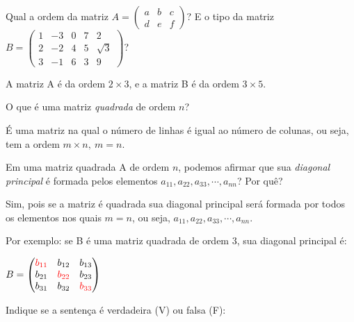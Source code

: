 \documentclass[pdftex, brazil, 12pt, oneside, addpoints, answers]{exam}
\newcommand{\vf}[1][{}]{%
  \fillin[#1][0.25in]%
}
\begin{document}
\begin{questions}
\question
Qual a ordem da matriz
$A = \begin{pmatrix}
a & b & c\\
d & e & f\end{pmatrix}$? E o tipo da matriz
$B = \begin{pmatrix}
  1 & -3 & 0 & 7 & 2\\
  2 & -2 & 4 & 5 & \sqrt{3}\\
  3 & -1 & 6 & 3 & 9
\end{pmatrix}$?
\begin{solutionorlines}[0.50in]
  A matriz A é da ordem $2 \times 3$, e a matriz B é da ordem $3 \times 5$.
\end{solutionorlines}

\question
O que é uma matriz \emph{quadrada} de ordem $n$?
\begin{solutionorlines}[0.50in]
  É uma matriz na qual o número de linhas é igual ao número de colunas, ou seja,
  tem a ordem $m \times n,\ m = n$.
\end{solutionorlines}

\question
Em uma matriz quadrada A de ordem $n$, podemos afirmar que sua \emph{diagonal
  principal} é formada pelos elementos $a_{11}, a_{22}, a_{33}, \cdots, a_{nn}$? Por quê?
\begin{solutionorlines}[0.75in]
  Sim, pois se a matriz é quadrada sua diagonal principal será formada por todos os
  elementos nos quais $m = n$, ou seja, $a_{11}, a_{22}, a_{33}, \cdots, a_{nn}$.

  Por exemplo: se B é uma matriz quadrada de ordem 3, sua diagonal principal é:

  $B = \begin{pmatrix}
   \color{red} b_{11} & b_{12} & b_{13}\\
   b_{21} & \color{red} b_{22} & b_{23}\\
   b_{31} & b_{32} & \color{red} b_{33}
  \end{pmatrix}$ 
\end{solutionorlines}

\question
Indique se a sentença é verdadeira (V) ou falsa (F):
\end{questions}
\end{document}
